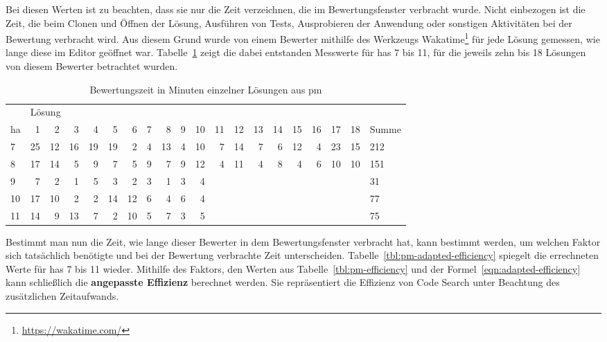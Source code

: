 Bei diesen Werten ist zu beachten, dass sie nur die Zeit verzeichnen, die im Bewertungsfenster verbracht wurde.
Nicht einbezogen ist die Zeit, die beim Clonen und Öffnen der Lösung, Ausführen von Tests, Ausprobieren der Anwendung oder sonstigen Aktivitäten bei der Bewertung verbracht wird.
Aus diesem Grund wurde von einem Bewerter mithilfe des Werkzeugs Wakatime\footnote{
    \url{https://wakatime.com/}
} für jede Lösung gemessen, wie lange diese im Editor geöffnet war.
Tabelle~\ref{tbl:pm-overhead} zeigt die dabei entstanden Messwerte für \acp{ha} 7 bis 11, für die jeweils zehn bis 18 Lösungen von diesem Bewerter betrachtet wurden.

\begin{table}
    \centering
    \caption{Bewertungszeit in Minuten einzelner Lösungen aus \ac{pm}}
    \begin{tabular}{|l|r|r|r|r|r|r|r|r|r|r|r|r|r|r|r|r|r|r|l|}
    \hline
        ~ & \multicolumn{18}{l|}{Lösung} & ~ \\
        \acs{ha} & 1  & 2  & 3  & 4  & 5  & 6  & 7 & 8  & 9 & 10 & 11 & 12 & 13 & 14 & 15 & 16 & 17 & 18 & Summe \\ \hline
        7  & 25 & 12 & 16 & 19 & 19 & 2  & 4 & 13 & 4 & 10 & 7  & 14 & 7  & 6  & 12 & 4  & 23 & 15 & 212   \\ \hline
        8  & 17 & 14 & 5  & 9  & 7  & 5  & 9 & 7  & 9 & 12 & 4  & 11 & 4  & 8  & 4  & 6  & 10 & 10 & 151   \\ \hline
        9  & 7  & 2  & 1  & 5  & 3  & 2  & 3 & 1  & 3 & 4  & ~  & ~  & ~  & ~  & ~  & ~  & ~  & ~  & 31    \\ \hline
        10 & 17 & 10 & 2  & 2  & 14 & 12 & 6 & 4  & 6 & 4  & ~  & ~  & ~  & ~  & ~  & ~  & ~  & ~  & 77    \\ \hline
        11 & 14 & 9  & 13 & 7  & 2  & 10 & 5 & 7  & 3 & 5  & ~  & ~  & ~  & ~  & ~  & ~  & ~  & ~  & 75    \\ \hline
    \end{tabular}
    \label{tbl:pm-overhead}
\end{table}

Bestimmt man nun die Zeit, wie lange dieser Bewerter in dem Bewertungsfenster verbracht hat, kann bestimmt werden, um welchen Faktor sich tatsächlich benötigte und bei der Bewertung verbrachte Zeit unterscheiden.
Tabelle~\ref{tbl:pm-adapted-efficiency} spiegelt die errechneten Werte für \acp{ha} 7 bis 11 wieder.
Mithilfe des Faktors, den Werten aus Tabelle~\ref{tbl:pm-efficiency} und der Formel~\ref{eqn:adapted-efficiency} kann schließlich die \textbf{angepasste Effizienz} berechnet werden.
Sie repräsentiert die Effizienz von Code Search unter Beachtung des zusätzlichen Zeitaufwands.


